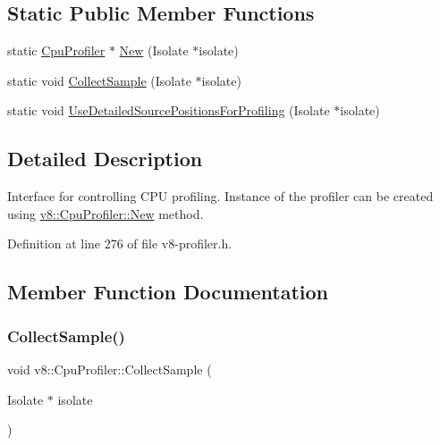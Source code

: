 \subsection*{Static Public Member Functions}
\begin{DoxyCompactItemize}
\item 
static \mbox{\hyperlink{classv8_1_1CpuProfiler}{Cpu\+Profiler}} $\ast$ \mbox{\hyperlink{classv8_1_1CpuProfiler_aaeebeaf3f6afb95a8ad6aa08a61e0938}{New}} (Isolate $\ast$isolate)
\item 
static void \mbox{\hyperlink{classv8_1_1CpuProfiler_a067e1af52938e37ca4776ead4bfa7847}{Collect\+Sample}} (Isolate $\ast$isolate)
\item 
static void \mbox{\hyperlink{classv8_1_1CpuProfiler_ad1e90d4c2c68bb978d73bbdd2308399f}{Use\+Detailed\+Source\+Positions\+For\+Profiling}} (Isolate $\ast$isolate)
\end{DoxyCompactItemize}


\subsection{Detailed Description}
Interface for controlling C\+PU profiling. Instance of the profiler can be created using \mbox{\hyperlink{classv8_1_1CpuProfiler_aaeebeaf3f6afb95a8ad6aa08a61e0938}{v8\+::\+Cpu\+Profiler\+::\+New}} method. 

Definition at line 276 of file v8-\/profiler.\+h.



\subsection{Member Function Documentation}
\mbox{\label{classv8_1_1CpuProfiler_a067e1af52938e37ca4776ead4bfa7847}} 
\subsubsection{\texorpdfstring{Collect\+Sample()}{CollectSample()}}
{\footnotesize\ttfamily void v8\+::\+Cpu\+Profiler\+::\+Collect\+Sample (\begin{DoxyParamCaption}\item[{Isolate $\ast$}]{isolate }\end{DoxyParamCaption})\hspace{0.3cm}{\ttfamily [static]}}

